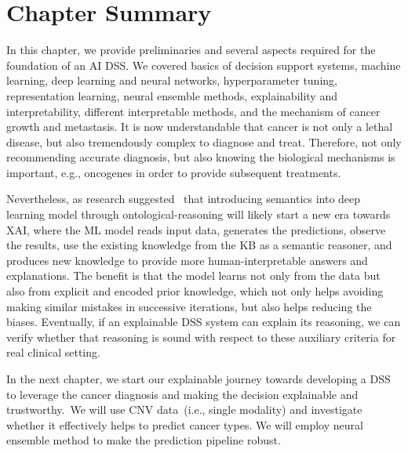 \section{Chapter Summary}
In this chapter, we provide preliminaries and several aspects required for the foundation of an AI DSS. We covered basics of decision support systems, machine learning, deep learning and neural networks, hyperparameter tuning, representation learning, neural ensemble methods, explainability and interpretability, different interpretable methods, and the mechanism of cancer growth and metastasis. It is now understandable that cancer is not only a lethal disease, but also tremendously complex to diagnose and treat. Therefore, not only recommending accurate diagnosis, but also knowing the biological mechanisms is important, e.g., oncogenes in order to provide subsequent treatments. 

\hspace*{3.5mm} Nevertheless, as research suggested~\cite{alirezaie2019semantic} that introducing semantics into deep learning model through ontological-reasoning will likely start a new era towards XAI, where the ML model reads input data, generates the predictions, observe the results, use the existing knowledge from the KB as a semantic reasoner, and produces new knowledge to provide more human-interpretable answers and explanations. The benefit is that the model learns not only from the data but also from explicit and encoded prior knowledge, which not only helps avoiding making similar mistakes in successive iterations, but also helps reducing the biases. Eventually, if an explainable DSS system can explain its reasoning, we can verify whether that reasoning is sound with respect to these auxiliary criteria for real clinical setting. 

\hspace*{3.5mm}In the next chapter, we start our explainable journey towards developing a DSS to leverage the cancer diagnosis and making the decision explainable and trustworthy.~We will use CNV data~(i.e., single modality) and investigate whether it effectively helps to predict cancer types. We will employ neural ensemble method to make the prediction pipeline robust. 
